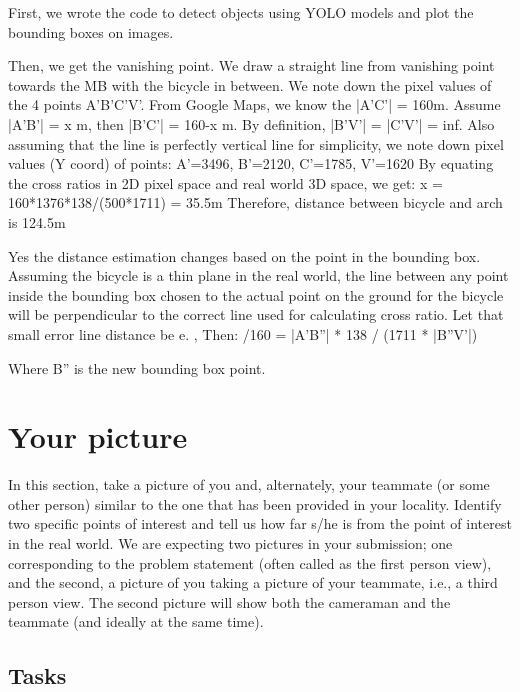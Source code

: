 \begin{studentSpace}
    \vspace{3cm}
    First, we wrote the code to detect objects using YOLO models and plot the bounding boxes on images.

    Then, we get the vanishing point. We draw a straight line from vanishing point towards the MB with the bicycle in between. We note down the pixel values of the 4 points A'B'C'V'. From Google Maps, we know the |A'C'| = 160m.
    Assume |A'B'| = x m, then |B'C'| = 160-x m. By definition, |B'V'| = |C'V'| = inf.
    Also assuming that the line is perfectly vertical line for simplicity, we note down pixel values (Y coord) of points: A'=3496, B'=2120, C'=1785, V'=1620
    By equating the cross ratios in 2D pixel space and real world 3D space, we get:
    x = 160*1376*138/(500*1711) = 35.5m
    Therefore, distance between bicycle and arch is 124.5m

    Yes the distance estimation changes based on the point in the bounding box. Assuming the bicycle is a thin plane in the real world, the line between any point inside the bounding box chosen to the actual point on the ground for the bicycle will be perpendicular to the correct line used for calculating cross ratio.
    Let that small error line distance be e. , Then:
    /160 = |A'B''| * 138 / (1711 * |B''V'|)

    Where B'' is the new bounding box point.
\end{studentSpace}


\section{Your picture}

In this section, take a picture of you and, alternately, your teammate
(or some other person) similar to the one that has been provided in
your locality. Identify two specific points of interest and tell us
how far s/he is from the point of interest in the real world. We are
expecting two pictures in your submission; one corresponding to the
problem statement (often called as the first person view), and the
second, a picture of you taking a picture of your teammate, i.e., a
third person view. The second picture will show both the cameraman and
the teammate (and ideally at the same time).

\subsection{Tasks}

